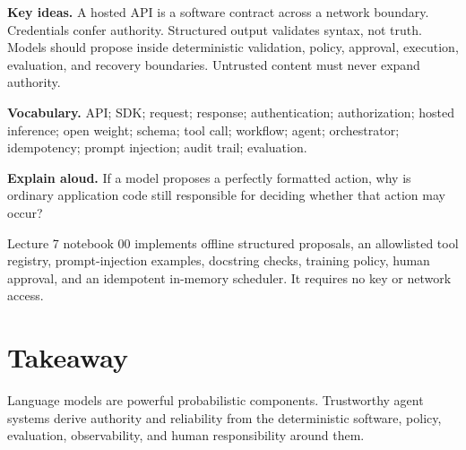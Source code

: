 \begin{chapterreview}
\textbf{Key ideas.} A hosted API is a software contract across a network
boundary. Credentials confer authority. Structured output validates syntax,
not truth. Models should propose inside deterministic validation, policy,
approval, execution, evaluation, and recovery boundaries. Untrusted content
must never expand authority.

\textbf{Vocabulary.} API; SDK; request; response; authentication;
authorization; hosted inference; open weight; schema; tool call; workflow;
agent; orchestrator; idempotency; prompt injection; audit trail; evaluation.

\textbf{Explain aloud.} If a model proposes a perfectly formatted action, why
is ordinary application code still responsible for deciding whether that
action may occur?
\end{chapterreview}

\begin{notebooklink}
Lecture 7 notebook 00 implements offline structured proposals, an allowlisted
tool registry, prompt-injection examples, docstring checks, training policy,
human approval, and an idempotent in-memory scheduler. It requires no key or
network access.
\end{notebooklink}

\section{Takeaway}

Language models are powerful probabilistic components. Trustworthy agent
systems derive authority and reliability from the deterministic software,
policy, evaluation, observability, and human responsibility around them.
